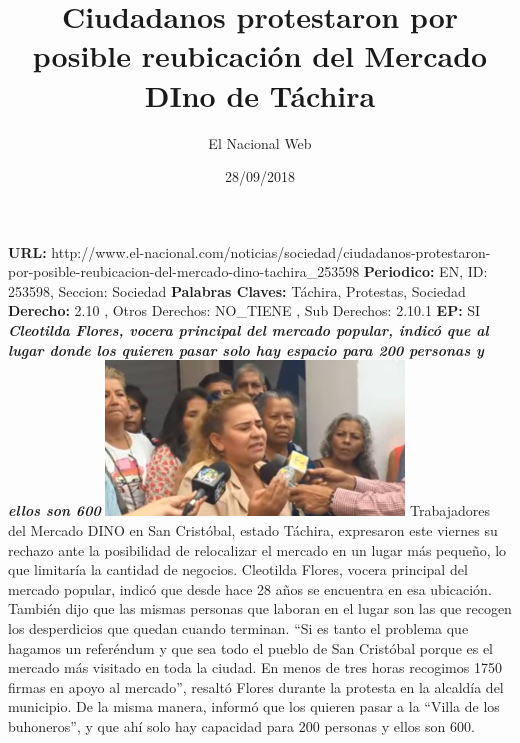 \documentclass{article}%
\title{\textbf{Ciudadanos protestaron por posible reubicación del Mercado DIno de Táchira}}%
\author{El Nacional Web}%
\date{28/09/2018}%
\begin{document}
%
\normalsize%
\maketitle%
\textbf{URL: }%
http://www.el{-}nacional.com/noticias/sociedad/ciudadanos{-}protestaron{-}por{-}posible{-}reubicacion{-}del{-}mercado{-}dino{-}tachira\_253598\newline%
%
\textbf{Periodico: }%
EN, %
ID: %
253598, %
Seccion: %
Sociedad\newline%
%
\textbf{Palabras Claves: }%
Táchira, Protestas, Sociedad\newline%
%
\textbf{Derecho: }%
2.10%
, Otros Derechos: %
NO\_TIENE%
, Sub Derechos: %
2.10.1%
\newline%
%
\textbf{EP: }%
SI\newline%
\newline%
%
\textbf{\textit{Cleotilda Flores, vocera principal del mercado popular, indicó que al lugar donde los quieren pasar solo hay espacio para 200 personas y ellos son 600}}%
\newline%
\newline%
%
\includegraphics[width=300px]{250.jpg}%
\newline%
%
Trabajadores del Mercado DINO en San Cristóbal, estado Táchira, expresaron este viernes su rechazo ante la posibilidad de relocalizar el mercado en un lugar más pequeño, lo que limitaría la cantidad de negocios.%
\newline%
%
Cleotilda Flores, vocera principal del mercado popular, indicó que desde hace 28 años se encuentra en esa ubicación. También dijo que las mismas personas que laboran en el lugar son las que recogen los desperdicios que quedan cuando terminan.%
\newline%
%
“Si es tanto el problema que hagamos un referéndum y que sea todo el pueblo de San Cristóbal porque es el mercado más visitado en toda la ciudad. En menos de tres horas recogimos 1750 firmas en apoyo al mercado”, resaltó Flores durante la protesta en la alcaldía del municipio.%
\newline%
%
De la misma manera, informó que los quieren pasar a la “Villa de los buhoneros”, y que ahí solo hay capacidad para 200 personas y ellos son 600.%
\newline%
%
\end{document}
